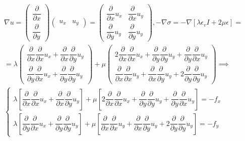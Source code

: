\begin{center}
	\begin{equation}
		\begin{split}
			\nabla u = \begin{pmatrix}
			\dfrac{\partial }{\partial x} \\[10pt]
			\dfrac{\partial }{\partial y}
			\end{pmatrix} \begin{pmatrix}
			u_x & u_y
			\end{pmatrix} = \begin{pmatrix}
			\dfrac{\partial }{\partial x} u_x & \dfrac{\partial }{\partial x} u_y \\[10pt]
			\dfrac{\partial }{\partial y} u_y & \dfrac{\partial }{\partial y} u_y 
			\end{pmatrix}, 
			- \nabla \sigma = -\nabla \left [ \lambda \epsilon_v I + 2 \mu \epsilon \right ] = \\[10pt] = \lambda \begin{pmatrix}
			 \dfrac{\partial }{\partial x} \dfrac{\partial }{\partial x} u_x + \dfrac{\partial }{\partial x} \dfrac{\partial }{\partial y} u_y \\[10pt]
			 \dfrac{\partial }{\partial y} \dfrac{\partial }{\partial x} u_x + \dfrac{\partial }{\partial y} \dfrac{\partial }{\partial y} u_y
			\end{pmatrix} + \mu \begin{pmatrix}
			2 \dfrac{\partial }{\partial x} \dfrac{\partial }{\partial x} u_x  + \dfrac{\partial }{\partial y} \dfrac{\partial }{\partial y} u_y + \dfrac{\partial }{\partial y} \dfrac{\partial }{\partial x} u_y \\[10pt]
			\dfrac{\partial }{\partial x} \dfrac{\partial }{\partial x} u_y + \dfrac{\partial }{\partial x} \dfrac{\partial }{\partial y} u_y + 2 \dfrac{\partial }{\partial y} \dfrac{\partial }{\partial y} u_y 
			\end{pmatrix}
			\implies \\[10pt] \begin{cases}
			\lambda \left [ \dfrac{\partial }{\partial x} \dfrac{\partial }{\partial x} u_x + \dfrac{\partial }{\partial x} \dfrac{\partial }{\partial y} u_y \right ] + \mu \left [ 2 \dfrac{\partial }{\partial x} \dfrac{\partial }{\partial x} u_x  + \dfrac{\partial }{\partial y} \dfrac{\partial }{\partial y} u_y + \dfrac{\partial }{\partial y} \dfrac{\partial }{\partial x} u_y \right ] = -f_x \\[10pt]
			\lambda \left [ \dfrac{\partial }{\partial y} \dfrac{\partial }{\partial x} u_x + \dfrac{\partial }{\partial y} \dfrac{\partial }{\partial y} u_y \right ] + \mu \left [ \dfrac{\partial }{\partial x} \dfrac{\partial }{\partial x} u_y + \dfrac{\partial }{\partial x} \dfrac{\partial }{\partial y} u_y + 2 \dfrac{\partial }{\partial y} \dfrac{\partial }{\partial y} u_y  \right ] = -f_y
			\end{cases}
		\end{split}
	\end{equation}
\end{center}
